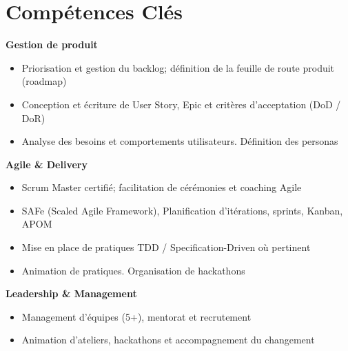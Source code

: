 \documentclass[11pt,a4paper]{article}
\newcommand{\skilltitle}[1]{\normalsize\textcolor{primaryblue}{\textbf{#1}}}
\begin{document}
\section*{Compétences Clés}

\begin{minipage}[t]{0.55\textwidth}
\skilltitle{Gestion de produit}
\begin{itemize}[leftmargin=10pt]
    \item Priorisation et gestion du backlog; définition de la feuille de route produit (roadmap)
    \item Conception et écriture de User Story, Epic et critères d'acceptation (DoD / DoR)
    \item Analyse des besoins et comportements utilisateurs. Définition des personas
\end{itemize}

\skilltitle{Agile \& Delivery}
\begin{itemize}[leftmargin=10pt]
    \item Scrum Master certifié; facilitation de cérémonies et coaching Agile
    \item SAFe (Scaled Agile Framework), Planification d'itérations, sprints, Kanban, APOM
    \item Mise en place de pratiques TDD / Specification-Driven où pertinent
    \item Animation de pratiques. Organisation de hackathons
\end{itemize}

\skilltitle{Leadership \& Management}
\begin{itemize}[leftmargin=10pt]
    \item Management d'équipes (5+), mentorat et recrutement
    \item Animation d'ateliers, hackathons et accompagnement du changement
\end{itemize}
\end{minipage}
\hfill
\end{document}
